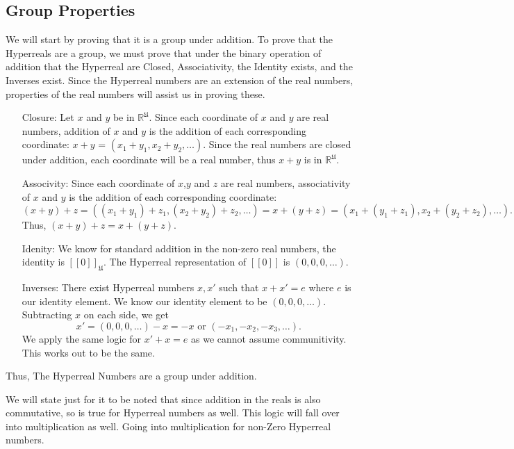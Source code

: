 \documentclass[12pt]{report}
\newcommand{\R}{\mathbb{R}}
\newcommand{\U}{\mathfrak{U}}
\begin{document}
\subsection*{Group Properties}
We will start by proving that it is a group under addition.
To prove that the Hyperreals are a group, we must prove that under the binary operation of addition that the Hyperreal are Closed, Associativity, the Identity exists, and the Inverses exist.
Since the Hyperreal numbers are an extension of the real numbers, properties of the real numbers will assist us in proving these.
\begin{enumerate}
    \item[Closure:]Let $x$ and $y$ be in $\R^\U $.
    Since each coordinate of $x$ and $y$ are real numbers, addition of $x$ and $y $ is the addition of each corresponding coordinate: $x+y$ = $(x_1 + y_1, x_2+y_2,\ldots)$.
    Since the real numbers are closed under addition, each coordinate will be a real number, thus $x+y$ is in $\R^\U$.
    \item[Associvity:]Since each coordinate of $x$,$y$ and $z$ are real numbers, associativity of $x$ and $y $ is the addition of each corresponding coordinate: \[(x+y)+z = ((x_1 + y_1)+z_1, (x_2+y_2)+z_2,\ldots) =x+(y+z) = (x_1 + (y_1+z_1), x_2+(y_2+z_2),\ldots).\]
    Thus, $(x+y)+z= x+(y+z)$.
    \item[Idenity:]We know for standard addition in the non-zero real numbers, the identity is $[[0]]_{\U}$.
    The Hyperreal representation of $[[0]]$ is $(0, 0, 0,\ldots)$.
    \item[Inverses:]There exist Hyperreal numbers $x, x'$ such that $x+x' = e $ where $e$ is our identity element.
    We know our identity element to be $(0, 0, 0, \ldots)$.
    Subtracting $x$ on each side, we get \[x' = (0, 0, 0,\ldots) - x = -x \text{ or } (-x_1, -x_2, -x_3,\ldots).\] We apply the same logic for $x' +x = e $ as we cannot assume communitivity.
    This works out to be the same.
\end{enumerate}
Thus, The Hyperreal Numbers are a group under addition.
\newline \par We will state just for it to be noted that since addition in the reals is also commutative, so is true for Hyperreal numbers as well.
This logic will fall over into multiplication as well.
Going into multiplication for non-Zero Hyperreal numbers. \newline \par
\end{document}
